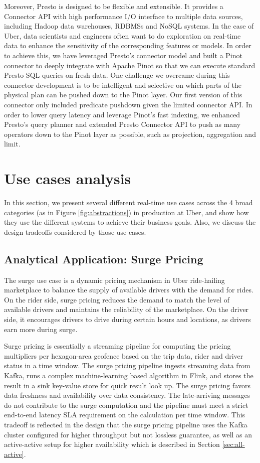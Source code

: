 \documentclass[sigconf]{acmart}
\begin{document}
Moreover, Presto is designed to be flexible and extensible. It provides a Connector API with high performance I/O interface to multiple data sources, including Hadoop data warehouses, RDBMSs and NoSQL systems. In the case of Uber, data scientists and engineers often want to do exploration on real-time data to enhance the sensitivity of the corresponding features or models. In order to achieve this, we have leveraged Presto’s connector model and built a Pinot connector to deeply integrate with Apache Pinot so that we can execute standard Presto SQL queries on fresh data. One challenge we overcame during this connector development is to be intelligent and selective on which parts of the physical plan can be pushed down to the Pinot layer. Our first version of this connector only included predicate pushdown given the limited connector API. In order to lower query latency and leverage Pinot’s fast indexing, we enhanced Presto’s query planner and extended Presto Connector API to push as many operators down to the Pinot layer as possible, such as projection, aggregation and limit.

\section{Use cases analysis} \label{sec:use-case}

In this section, we present several different real-time use cases across the 4 broad categories (as in Figure \ref{fig:abstractions}) in production at Uber, and show how they use the different systems to achieve their business goals. Also, we discuss the design tradeoffs considered by those use cases.

\subsection{Analytical Application: Surge Pricing}

The surge\cite{garg2019driver} use case is a dynamic pricing mechanism in Uber ride-hailing marketplace to balance the supply of available drivers with the demand for rides. On the rider side, surge pricing reduces the demand to match the level of available drivers and maintains the reliability of the marketplace. On the driver side, it encourages drivers to drive during certain hours and locations, as drivers earn more during surge. 

Surge pricing is essentially a streaming pipeline for computing the pricing multipliers per hexagon-area geofence based on the trip data, rider and driver status in a time window. The surge pricing pipeline ingests streaming data from Kafka, runs a complex machine-learning based algorithm in Flink, and stores the result in a sink key-value store for quick result look up. The surge pricing favors data freshness and availability over data consistency. The late-arriving messages do not contribute to the surge computation and the pipeline must meet a strict end-to-end latency SLA requirement on the calculation per time window. This tradeoff is reflected in the design that the surge pricing pipeline uses the Kafka cluster configured for higher throughput but not lossless guarantee, as well as an active-active setup for higher availability which is described in Section \ref{sec:all-active}.
\end{document}

